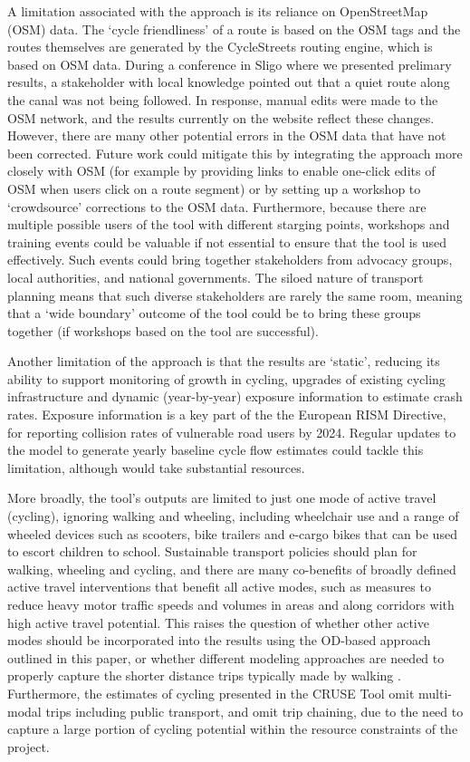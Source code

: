 \documentclass[
  super,
  preprint,
  3p]{elsarticle}
\begin{document}
A limitation associated with the approach is its reliance on
OpenStreetMap (OSM) data. The `cycle friendliness' of a route is based
on the OSM tags and the routes themselves are generated by the
CycleStreets routing engine, which is based on OSM data. During a
conference in Sligo where we presented prelimary results, a stakeholder
with local knowledge pointed out that a quiet route along the canal was
not being followed. In response, manual edits were made to the OSM
network, and the results currently on the website reflect these changes.
However, there are many other potential errors in the OSM data that have
not been corrected. Future work could mitigate this by integrating the
approach more closely with OSM (for example by providing links to enable
one-click edits of OSM when users click on a route segment) or by
setting up a workshop to `crowdsource' corrections to the OSM data.
Furthermore, because there are multiple possible users of the tool with
different starging points, workshops and training events could be
valuable if not essential to ensure that the tool is used effectively.
Such events could bring together stakeholders from advocacy groups,
local authorities, and national governments. The siloed nature of
transport planning means that such diverse stakeholders are rarely the
same room, meaning that a `wide boundary' outcome of the tool could be
to bring these groups together (if workshops based on the tool are
successful).

Another limitation of the approach is that the results are `static',
reducing its ability to support monitoring of growth in cycling,
upgrades of existing cycling infrastructure and dynamic (year-by-year)
exposure information to estimate crash rates. Exposure information is a
key part of the the European RISM Directive, for reporting collision
rates of vulnerable road users by 2024. Regular updates to the model to
generate yearly baseline cycle flow estimates could tackle this
limitation, although would take substantial resources.

More broadly, the tool's outputs are limited to just one mode of active
travel (cycling), ignoring walking and wheeling, including wheelchair
use and a range of wheeled devices such as scooters, bike trailers and
e-cargo bikes that can be used to escort children to school. Sustainable
transport policies should plan for walking, wheeling and cycling, and
there are many co-benefits of broadly defined active travel
interventions that benefit all active modes, such as measures to reduce
heavy motor traffic speeds and volumes in areas and along corridors with
high active travel potential. This raises the question of whether other
active modes should be incorporated into the results using the OD-based
approach outlined in this paper, or whether different modeling
approaches are needed to properly capture the shorter distance trips
typically made by walking \citep{cooper2018}. Furthermore, the estimates
of cycling presented in the CRUSE Tool omit multi-modal trips including
public transport, and omit trip chaining, due to the need to capture a
large portion of cycling potential within the resource constraints of
the project.
\end{document}
